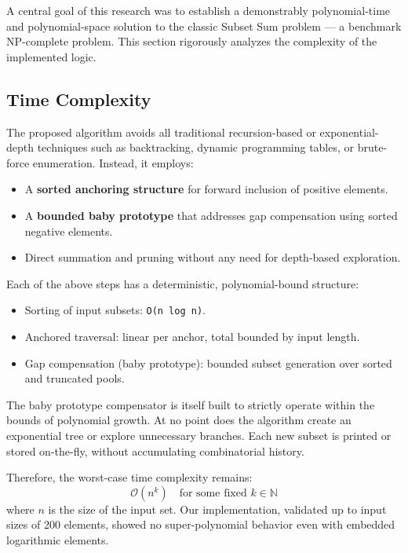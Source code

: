 \documentclass[11pt]{article}
\begin{document}
A central goal of this research was to establish a demonstrably polynomial-time and polynomial-space solution to the classic Subset Sum problem — a benchmark NP-complete problem. This section rigorously analyzes the complexity of the implemented logic.

\subsection{Time Complexity}

The proposed algorithm avoids all traditional recursion-based or exponential-depth techniques such as backtracking, dynamic programming tables, or brute-force enumeration. Instead, it employs:

\begin{itemize}
    \item A \textbf{sorted anchoring structure} for forward inclusion of positive elements.
    \item A \textbf{bounded baby prototype} that addresses gap compensation using sorted negative elements.
    \item Direct summation and pruning without any need for depth-based exploration.
\end{itemize}

Each of the above steps has a deterministic, polynomial-bound structure:

\begin{itemize}
    \item Sorting of input subsets: \texttt{O(n log n)}.
    \item Anchored traversal: linear per anchor, total bounded by input length.
    \item Gap compensation (baby prototype): bounded subset generation over sorted and truncated pools.
\end{itemize}

The baby prototype compensator is itself built to strictly operate within the bounds of polynomial growth. At no point does the algorithm create an exponential tree or explore unnecessary branches. Each new subset is printed or stored on-the-fly, without accumulating combinatorial history.

Therefore, the worst-case time complexity remains:
\[
\mathcal{O}(n^k) \quad \text{for some fixed } k \in \mathbb{N}
\]
where $n$ is the size of the input set. Our implementation, validated up to input sizes of 200 elements, showed no super-polynomial behavior even with embedded logarithmic elements.
\end{document}
